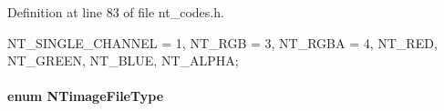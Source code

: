 Definition at line 83 of file nt\_\-codes.h.




\begin{DoxyCode}
                       {NT_SINGLE_CHANNEL = 1, NT_RGB = 3, NT_RGBA = 4,
                        NT_RED, NT_GREEN, NT_BLUE, NT_ALPHA}; 
\end{DoxyCode}


\paragraph[{NTimageFileType}]{\setlength{\rightskip}{0pt plus 5cm}enum {\bf NTimageFileType}}\hfill\label{nt__codes_8h_a231ce3e06dce0c0308bfa7c58c1bbcb6}
